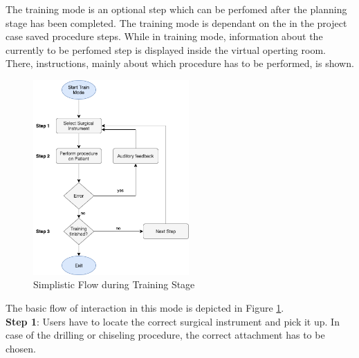 The training mode is an optional step which can be perfomed after the planning stage has been completed.
The training mode is dependant on the in the project case saved procedure steps.
While in training mode, information about the currently to be perfomed step is displayed inside the virtual operting room.
There, instructions, mainly about which procedure has to be performed, is shown.

\begin{figure}[h]
    \centering
    \includegraphics[width=225px]{images/implementation/features/training/training_flow.png}
    \caption{\label{fig::TrainingFlow}Simplistic Flow during Training Stage}
\end{figure}

The basic flow of interaction in this mode is depicted in Figure \ref{fig::TrainingFlow}.
\\
\textbf{Step 1}: Users have to locate the correct surgical instrument and pick it up.
In case of the drilling or chiseling procedure, the correct attachment has to be chosen.


